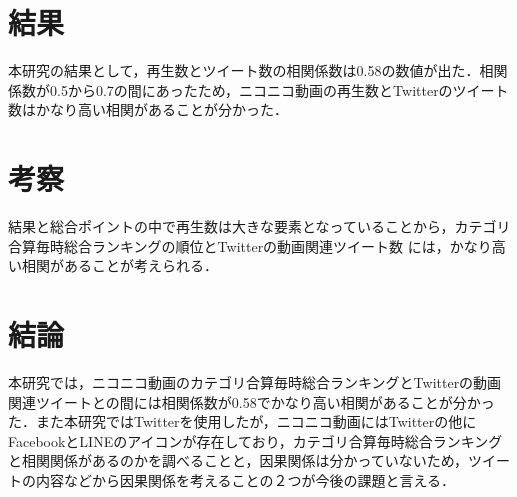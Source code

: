 \documentclass[uplatex,twocolumn,dvipdfmx]{jsarticle}
\begin{document}
\section{結果}
本研究の結果として，再生数とツイート数の相関係数は0.58の数値が出た．相関係数が0.5から0.7の間にあったため，ニコニコ動画の再生数とTwitterのツイート数はかなり高い相関があることが分かった．
\section{考察}
結果と総合ポイントの中で再生数は大きな要素となっていることから，カテゴリ合算毎時総合ランキングの順位とTwitterの動画関連ツイート数 には，かなり高い相関があることが考えられる．
\section{結論}
本研究では，ニコニコ動画のカテゴリ合算毎時総合ランキングとTwitterの動画関連ツイートとの間には相関係数が0.58でかなり高い相関があることが分かった．また本研究ではTwitterを使用したが，ニコニコ動画にはTwitterの他にFacebookとLINEのアイコンが存在しており，カテゴリ合算毎時総合ランキングと相関関係があるのかを調べることと，因果関係は分かっていないため，ツイートの内容などから因果関係を考えることの２つが今後の課題と言える．



\end{document}
